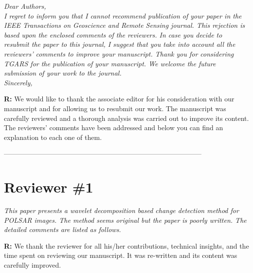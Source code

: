 \documentclass[11pt]{report}
\begin{document}
\textit{Dear Authors,\\
I regret to inform you that I cannot recommend publication of your paper in the IEEE Transactions on Geoscience and
Remote Sensing journal. This rejection is based upon the enclosed comments of the reviewers.
In case you decide to resubmit the paper to this journal, I suggest that you take into account all the reviewers’ comments
to improve your manuscript.
Thank you for considering TGARS for the publication of your manuscript. We welcome the future submission of your
work to the journal.\\
Sincerely,}

\medskip

\textbf{R:} We would like to thank the associate editor for his consideration with our manuscript and for allowing us to resubmit our work. The manuscript was carefully reviewed and a thorough analysis was carried out to improve its content. The reviewers' comments have been addressed and below you can find an explanation to each one of them.

\medskip

\medskip

\medskip


\vspace{0.25cm}

\noindent---------------------------------------------------------------------------------------
\section*{Reviewer \#1}

\textit{This paper presents a wavelet decomposition based change detection method for POLSAR images. The method seems original but the paper is poorly written. The detailed comments are listed as follows.}

\medskip

\textbf{R:} We thank the reviewer for all his/her contributions, technical insights, and the time spent on reviewing our manuscript. It was re-written and its content was carefully improved.

\medskip
\end{document}
